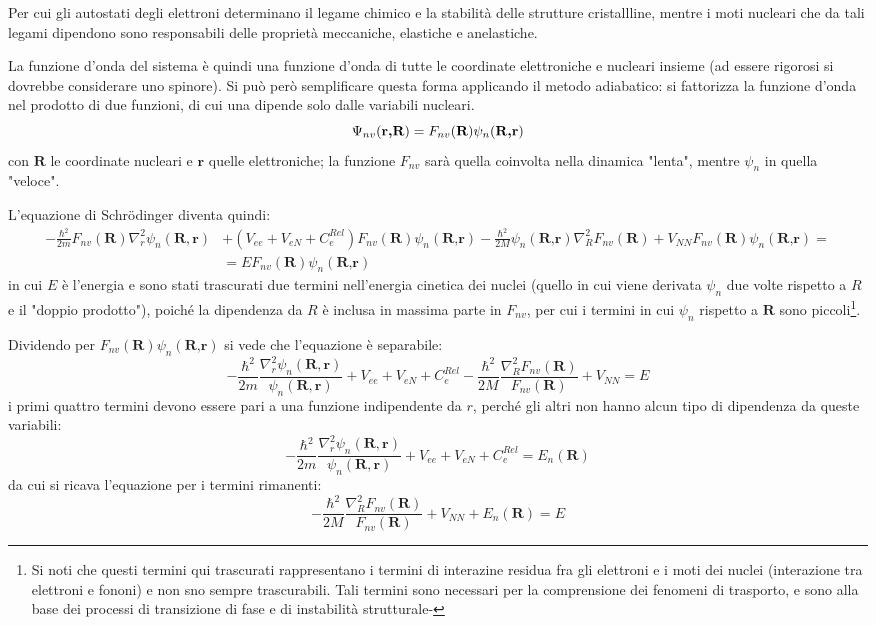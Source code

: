 Per cui gli autostati degli elettroni determinano il legame chimico e la stabilità delle strutture cristallline, mentre i moti nucleari che da tali legami dipendono sono responsabili delle proprietà meccaniche, elastiche e anelastiche.
\newline

La funzione d'onda del sistema è quindi una funzione d'onda di tutte le coordinate elettroniche e nucleari insieme (ad essere rigorosi si dovrebbe considerare uno spinore).
Si può però semplificare questa forma applicando il metodo adiabatico: si fattorizza la funzione d'onda nel prodotto di due funzioni, di cui una dipende solo dalle variabili nucleari.
\[ \Psi_{nv} (\textbf{r,R}) = F_{nv}(\textbf{R}) \psi_{n}(\textbf{R,\textbf{r}}) \]
con $ \textbf{R} $ le coordinate nucleari e $ \textbf{r} $ quelle elettroniche; la funzione $ F_{nv} $ sarà quella coinvolta nella dinamica "lenta", mentre $ \psi_{n} $ in quella "veloce".

L'equazione di Schrödinger diventa quindi:
\begin{align*}
-\frac{\hbar^2}{2m} F_{nv}(\textbf{R}) \nabla_r^2  \psi_{n}(\textbf{R},\textbf{r}) &+ (V_{ee} + V_{eN} + C_e^{Rel})F_{nv}(\textbf{R})\psi_{n}(\textbf{R,r}) - \frac{\hbar^2}{2M} \psi_{n}(\textbf{R,r}) \nabla_R^2 F_{nv}(\textbf{R}) + V_{NN} F_{nv}(\textbf{R})\psi_{n}(\textbf{R,r}) =\\
&= E F_{nv}(\textbf{R}) \psi_{n}(\textbf{R,r})
\end{align*}
in cui $ E $ è l'energia e sono stati trascurati due termini nell'energia cinetica dei nuclei (quello in cui viene derivata $ \psi_{n} $ due volte rispetto a $ R $ e il "doppio prodotto"), poiché la dipendenza da $ R $ è inclusa in massima parte in $ F_{nv} $, per cui i termini in cui $ \psi_{n} $ rispetto a $ \textbf{R} $ sono piccoli\footnote{Si noti che questi termini qui trascurati rappresentano i termini di interazine residua fra gli elettroni e i moti dei nuclei (interazione tra elettroni e fononi) e non sno sempre trascurabili. Tali termini sono necessari per la comprensione dei fenomeni di trasporto, e sono alla base dei processi di transizione di fase e di instabilità strutturale-}.

Dividendo per $ F_{nv}(\textbf{R}) \psi_{n}(\textbf{R,r}) $ si vede che l'equazione è separabile:
\[ -\frac{\hbar^2}{2m} \frac{\nabla_r^2  \psi_{n}(\textbf{R},\textbf{r})}{\psi_{n}(\textbf{R},\textbf{r})} + V_{ee} + V_{eN} + C_e^{Rel} - \frac{\hbar^2}{2M} \frac{\nabla_R^2 F_{nv}(\textbf{R})}{F_{nv}(\textbf{R})} + V_{NN} = E  \]
i primi quattro termini devono essere pari a una funzione indipendente da $ r $, perché gli altri non hanno alcun tipo di dipendenza da queste variabili:
\[ -\frac{\hbar^2}{2m} \frac{\nabla_r^2  \psi_{n}(\textbf{R},\textbf{r})}{\psi_{n}(\textbf{R},\textbf{r})} + V_{ee} + V_{eN} + C_e^{Rel} = E_n(\textbf{R}) \]
da cui si ricava l'equazione per i termini rimanenti:
\[ - \frac{\hbar^2}{2M} \frac{\nabla_R^2 F_{nv}(\textbf{R})}{F_{nv}(\textbf{R})} + V_{NN} + E_n(\textbf{R}) = E  \]

